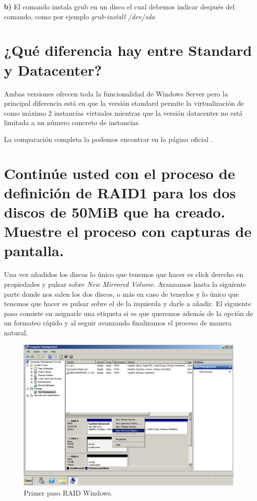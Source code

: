 \textbf{b)} El comando instala grub \cite{grub} en un disco el cual debemos indicar después del comando, como por ejemplo \textit{grub-install /dev/sda}

\section{¿Qué diferencia hay entre Standard y Datacenter?}
Ambas versiones ofrecen toda la funcionalidad de Windows Server pero la principal diferencia está en que la versión standard permite la virtualización de como máximo 2 instancias virtuales mientras que la versión datacenter no está limitada a un número concreto de instancias.

La comparación completa la podemos encontrar en la página oficial \cite{windows_std_data}.



\section{Continúe usted con el proceso de definición de RAID1 para los dos discos de 50MiB que ha creado. Muestre el proceso con capturas de pantalla.}

Una vez añadidos los discos lo único que tenemos que hacer es click derecho en propiedades y pulsar sobre \textit{New Mirrored Volume}. Avanzamos hasta la siguiente parte donde nos salen los dos discos, o más en caso de tenerlos y lo único que tenemos que hacer es pulsar sobre el de la izquierda y darle a añadir. El siguiente paso consiste en asignarle una etiqueta si es que queremos además de la opción de un formateo rápido y al seguir avanzando finalizamos el proceso de manera natural.

\begin{figure}[H]
	\centering
	\includegraphics[scale=0.45]{RAIDW1.png}
	\caption{Primer paso RAID Windows. \label{fig:figura5}}
\end{figure}


